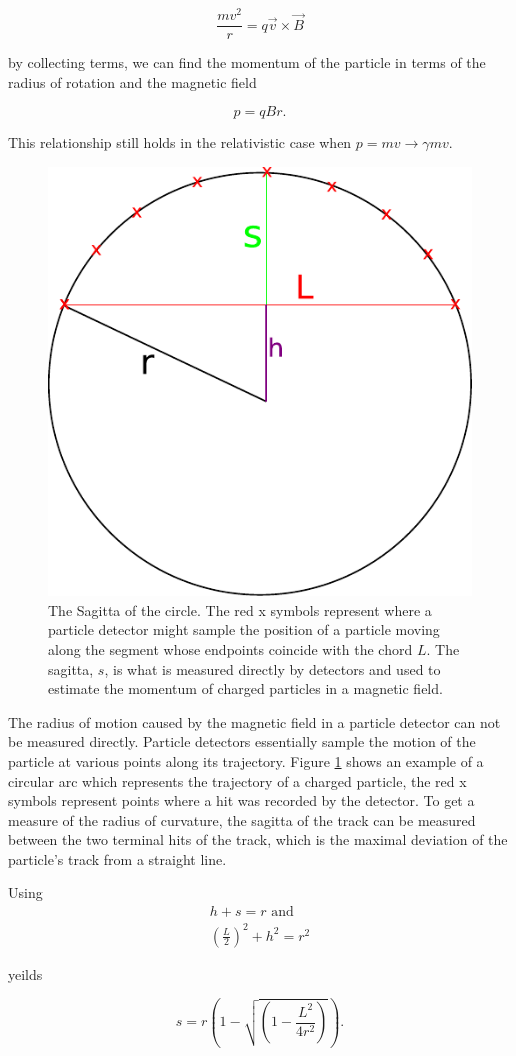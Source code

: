   \[
    \frac{mv^2}{r} = q\vec{v}\times\vec{B}
  \]

  by collecting terms, we can find the momentum of the particle in terms of the radius of rotation and the magnetic field

  \[
    p = qBr.
  \]

  This relationship still holds in the relativistic case when $p = mv \to \gamma mv$.

  \begin{figure}[h!]
    \centering
    \includegraphics[width=.4\textwidth]{figures/Sagitta.pdf}
    \caption[The Sagitta of the circle.]{The Sagitta of the circle. The red x symbols represent where a particle detector might sample the position of a particle moving along the segment whose endpoints coincide with the chord $L$. The sagitta, $s$, is what is measured directly by detectors and used to estimate the momentum of charged particles in a magnetic field.}
    \label{fig:sagitta}
  \end{figure}

  The radius of motion caused by the magnetic field in a particle detector can not be measured directly. Particle detectors essentially sample the motion of the particle at various points along its trajectory. Figure \ref{fig:sagitta} shows an example of a circular arc which represents the trajectory of a charged particle, the red x symbols represent points where a hit was recorded by the detector. To get a measure of the radius of curvature, the sagitta of the track can be measured between the two terminal hits of the track, which is the maximal deviation of the particle's track from a straight line. 

  Using 
  \begin{align*}
    h+ s = r \text{ and} \\
    \left(\frac{L}{2}\right)^2 + h^2 = r^2
  \end{align*}

  yeilds

  \[
    s = r\left(1 - \sqrt{\left(1-\frac{L^2}{4r^2}\right)} \right).
  \]

